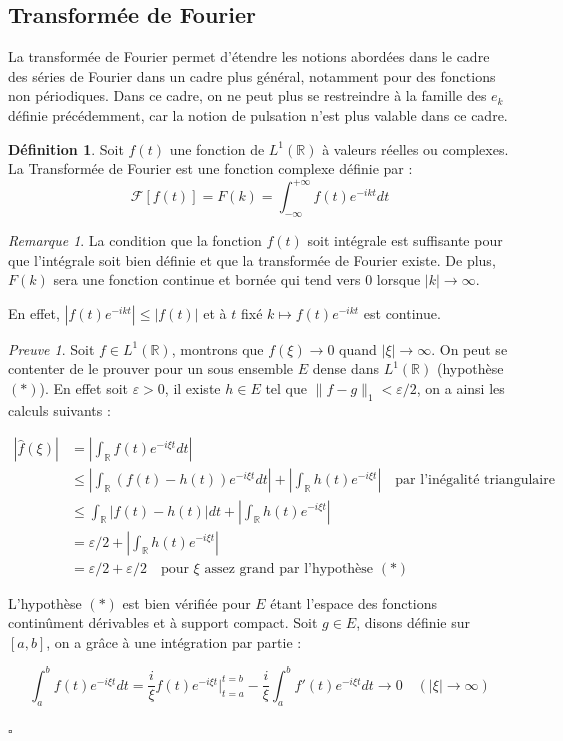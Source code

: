 \documentclass[]{article}
\theoremstyle{remark}
\newtheorem{myrem}{Remarque}
\newtheorem{myproof}{Preuve}
\theoremstyle{definition}
\newtheorem{mydef}{Définition}
\newcommand{\cqfd}{
	\hfill$\square$
}
\begin{document}
	\subsection{Transformée de Fourier}
		La transformée de Fourier permet d'étendre les notions abordées dans le cadre des séries de Fourier dans un cadre plus général, notamment pour des fonctions non périodiques. 
		Dans ce cadre, on ne peut plus se restreindre à la famille des $e_k$ définie précédemment, car la notion de pulsation n'est plus valable dans ce cadre. 
	
	\begin{mydef}
		Soit $f(t)$ une fonction de $L^1(\mathbb{R})$ à valeurs réelles ou complexes. La Transformée de Fourier est une fonction complexe définie par :
		$$ \mathcal{F}[f(t)] = F(k)= \int_{-\infty}^{+\infty}f(t)e^{-ikt}dt $$ 
	\end{mydef}

	\begin{myrem}
		La condition que la fonction $f(t)$ soit intégrale est suffisante pour que l'intégrale soit bien définie et que la transformée de Fourier existe. 
		De plus, $F(k)$ sera une fonction continue et bornée qui tend vers 0 lorsque $|k| \longrightarrow \infty$.
		
		En effet, $|f(t)e^{-i k t}| \leqslant |f(t)|$ et à $t$ fixé $k \mapsto f(t) e^{- i k t}$ est continue.
	\end{myrem}
	
	\begin{myproof}
		Soit $f \in L^1(\mathbb{R})$, montrons que $f(\xi) \to 0$ quand $|\xi| \to \infty$. On peut se contenter de le prouver pour un sous ensemble $E$ dense dans $L^1(\mathbb{R})$ (hypothèse $(*)$). En effet soit $\varepsilon > 0$, il existe $h \in E$ tel que $\|f - g\|_1 < \varepsilon / 2$, on a ainsi les calculs suivants :
		
		\begin{align*}
			|\hat{f}(\xi)| & = \left|\int_\mathbb{R} f(t) e^{-i \xi t} dt\right| \\
			& \leqslant \left|\int_\mathbb{R} (f(t) - h(t))e^{- i \xi t} dt\right| + \left|\int_\mathbb{R} h(t) e^{- i \xi t}\right| \quad \text{par l'inégalité triangulaire} \\
			& \leqslant \int_{\mathbb{R}} |f(t) - h(t)| dt + \left|\int_\mathbb{R} h(t) e^{- i \xi t}\right| \\
			&= \varepsilon / 2 + \left|\int_\mathbb{R} h(t) e^{- i \xi t}\right| \\
			&= \varepsilon/2 + \varepsilon/2 \quad \text{pour $\xi$ assez grand par l'hypothèse } (*)
		\end{align*}
		
		L'hypothèse $(*)$ est bien vérifiée pour $E$ étant l'espace des fonctions continûment dérivables et à support compact. Soit $g \in E$, disons définie sur $[a, b]$, on a grâce à une intégration par partie :
		
		$$\int_{a}^{b} f(t) e^{- i \xi t} dt = \frac{i}{\xi} f(t) e^{- i \xi t} \bigg\vert_{t = a}^{t=b} - \frac{i}{\xi} \int_{a}^{b} f'(t) e^{- i \xi t} dt \longrightarrow 0 \quad (|\xi| \to \infty)$$
		
		\cqfd
	\end{myproof}
	
\end{document}
